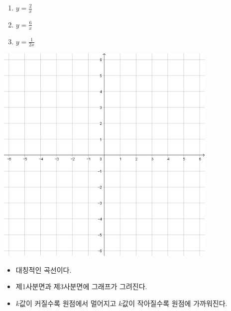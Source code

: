\documentclass{oblivoir}
\begin{document}
%
\begin{enumerate}\label{rational2}
\item
\(y=\frac2x\)
\item
\(y=\frac6x\)
\item
\(y=\frac1{2x}\)
\end{enumerate}
\begin{center}
\includegraphics[width=0.8\textwidth]{66grid}
\end{center}

\begin{mdframed}
%
\begin{itemize}\label{rational3}
\item
대칭적인 곡선이다.\footnotemark
\item
제1사분면과 제3사분면에 그래프가 그려진다.
\item
\(k\)값이 커질수록 원점에서 멀어지고 \(k\)값이 작아질수록 원점에 가까워진다.
\end{itemize}
\end{mdframed}
\end{document}
